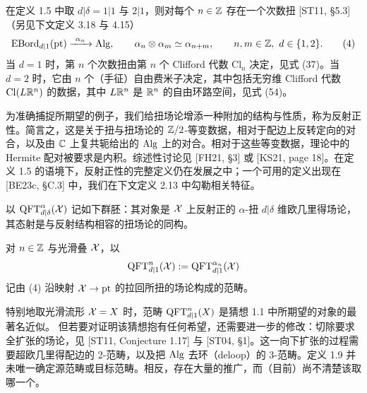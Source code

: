 \begin{example}[1.8（次数扭）]
在定义 1.5 中取 $d|\delta=1|1$ 与 $2|1$，则对每个 $n\in\mathbb{Z}$ 存在一个次数扭 [ST11, §5.3]（另见下文定义 3.18 与 4.15）
\begin{equation}
\mathrm{EBord}_{d|1}(\mathrm{pt})\xrightarrow{\ \alpha_n\ }\Alg,
\qquad \alpha_n\otimes\alpha_m\simeq\alpha_{n+m},
\qquad n,m\in\Z,\ d\in\{1,2\}.
\tag{4}
\end{equation}
当 $d=1$ 时，第 $n$ 个次数扭由第 $n$ 个 Clifford 代数 $\mathrm{Cl}_n$ 决定，见式 (37)。当 $d=2$ 时，它由 $n$ 个（手征）自由费米子决定，其中包括无穷维 Clifford 代数 $\mathrm{Cl}(L\mathbb{R}^n)$ 的数据，其中 $L\mathbb{R}^n$ 是 $\mathbb{R}^n$ 的自由环路空间，见式 (54)。
\end{example}

为准确捕捉所期望的例子，我们给扭场论增添一种附加的结构与性质，称为反射正性。简言之，这是关于扭与扭场论的 $\mathbb{Z}/2$-等变数据，相对于配边上反转定向的对合，以及由 $\mathbb{C}$ 上复共轭给出的 $\operatorname{Alg}$ 上的对合。相对于这些等变数据，理论中的 Hermite 配对被要求是内积。综述性讨论见 [FH21, §3] 或 [KS21, page 18]。在定义 1.5 的语境下，反射正性的完整定义仍在发展之中；一个可用的定义出现在 [BE23c, §C.3] 中，我们在下文定义 2.13 中勾勒相关特征。

\begin{definition}[1.9]
以 $\operatorname{QFT}^{\alpha}_{d|\delta}(\mathcal{X})$ 记如下群胚：其对象是 $\mathcal{X}$ 上反射正的 $\alpha$-扭 $d|\delta$ 维欧几里得场论，其态射是与反射结构相容的扭场论的同构。
\end{definition}

\begin{definition}[1.10]
对 $n\in\mathbb{Z}$ 与光滑叠 $\mathcal{X}$，以
\[
\operatorname{QFT}^{n}_{d|1}(\mathcal{X}):=\operatorname{QFT}^{\alpha_n}_{d|1}(\mathcal{X})
\]
记由 (4) 沿映射 $\mathcal{X}\to\mathrm{pt}$ 的拉回所扭的场论构成的范畴。
\end{definition}

特别地取光滑流形 $\mathcal{X}=X$ 时，范畴 $\operatorname{QFT}^{n}_{d|1}(X)$ 是猜想 1.1 中所期望的对象的最著名近似。
但若要对证明该猜想抱有任何希望，还需要进一步的修改：切除要求全扩张的场论，见 [ST11, Conjecture 1.17] 与 [ST04, §1]。这一向下扩张的过程需要超欧几里得配边的 2-范畴，以及把 $\operatorname{Alg}$ 去环（deloop）的 3-范畴。定义 1.9 并未唯一确定源范畴或目标范畴。相反，存在大量的推广，而（目前）尚不清楚该取哪一个。

